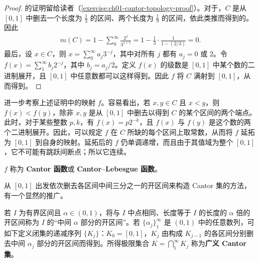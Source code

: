 \documentclass[../../main.tex]{subfiles}%
\begin{document}
\begin{proof}
的证明留给读者（\cref{exercise:ch01-cantor-topology-proof}）。对于，$C$ 是从 $[0,1]$ 中删去一个长度为 $\frac13$ 的区间、两个长度为 $\frac19$ 的区间，依此类推而得到的。因此
\begin{align*}
m(C)=1-\sum_0^\infty\frac{2^j}{3^{j+1}}=1-\frac13\cdot\frac1{1-(2/3)}=0.
\end{align*}
最后，设 $x\in C$，则 $x=\sum_0^\infty a_j3^{-j}$，其中对所有 $j$ 都有 $a_j=0$ 或 $2$。令 $f(x)=\sum_1^\infty b_j2^{-j}$，其中 $b_j=a_j/2$。定义 $f(x)$ 的级数是 $[0,1]$ 中某个数的二进制展开，且 $[0,1]$ 中任意数都可以这样得到。因此 $f$ 将 $C$ 满射到 $[0,1]$，从而得到。
\end{proof}

进一步考察上述证明中的映射 $f$。容易看出，若 $x,y\in C$ 且 $x<y$，则 $f(x)<f(y)$，除非 $x,y$ 是从 $[0,1]$ 中删去以得到 $C$ 的某个区间的两个端点。此时，对于某些整数 $p,k$，有 $f(x)=p2^{-k}$，且 $f(x)$ 与 $f(y)$ 是这个数的两个二进制展开。因此，可以规定 $f$ 在 $C$ 所缺的每个区间上取常数，从而将 $f$ 延拓为 $[0,1]$ 到自身的映射。延拓后的 $f$ 仍单调递增，而且由于其值域为整个 $[0,1]$，它不可能有跳跃间断点；所以它连续。
\begin{definition}[Cantor 函数]\label{definition:ch01-cantor-function}
$f$ 称为 \textbf{Cantor 函数}或 \textbf{Cantor–Lebesgue 函数}。
\end{definition}


从 $[0,1]$ 出发依次删去各区间中间三分之一的开区间来构造 Cantor 集的方法，有一个显然的推广。
\begin{definition}[广义 Cantor 集]\label{definition:ch01-generalized-cantor-set}
若 $I$ 为有界区间且 $\alpha\in(0,1)$，将与 $I$ 中点相同、长度等于 $I$ 的长度的 $\alpha$ 倍的开区间称为 $I$ 的“中间 $\alpha$ 部分的开区间”。若 $\{\alpha_j\}_1^\infty$ 是 $(0,1)$ 中的任意数列，可如下定义闭集的递减序列 $\{K_j\}$：$K_0=[0,1]$，$K_j$ 由构成 $K_{j-1}$ 的各区间分别删去中间 $\alpha_j$ 部分的开区间而得到。所得极限集合 $K=\bigcap_1^\infty K_j$ 称为\textbf{广义 Cantor 集}。
\end{definition}
\end{document}
